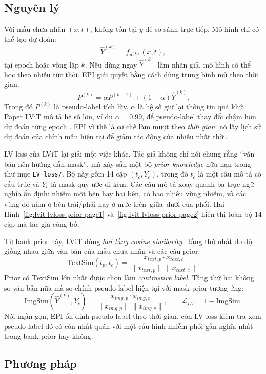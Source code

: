 \subsection*{Nguyên lý}

Với mẫu chưa nhãn \((x,t)\), không tồn tại \(y\) để so sánh trực tiếp. Mô hình chỉ có thể tạo dự đoán:
\[
\hat{Y}^{(k)} = f_{\theta^{(k)}}(x,t),
\]
tại epoch hoặc vòng lặp \(k\). Nếu dùng ngay \(\hat{Y}^{(k)}\) làm nhãn giả, mô hình có thể học theo nhiễu tức thời. EPI giải quyết bằng cách dùng trung bình mũ theo thời gian:
\[
P^{(k)}=\alpha P^{(k-1)} + (1-\alpha)\hat{Y}^{(k)}.
\]
Trong đó \(P^{(k)}\) là pseudo-label tích lũy, \(\alpha\) là hệ số giữ lại thông tin quá khứ. Paper LViT mô tả hệ số lớn, ví dụ \(\alpha=0.99\), để pseudo-label thay đổi chậm hơn dự đoán từng epoch \cite{li2023lvit}. EPI vì thế là cơ chế làm mượt theo \emph{thời gian}: nó lấy lịch sử dự đoán của chính mẫu hiện tại để giảm tác động của nhiễu nhất thời.

LV loss của LViT lại giải một việc khác. Tác giả không chỉ nói chung rằng ``văn bản nên hướng dẫn mask'', mà xây sẵn một bộ \emph{prior knowledge} hữu hạn trong thư mục \texttt{LV\_loss/}. Bộ này gồm 14 cặp \((t_c,Y_c)\), trong đó \(t_c\) là một câu mô tả có cấu trúc và \(Y_c\) là mask quy ước đi kèm. Các câu mô tả xoay quanh ba trục ngữ nghĩa ổn định: nhiễm một bên hay hai bên, có bao nhiêu vùng nhiễm, và các vùng đó nằm ở bên trái/phải hay ở mức trên--giữa--dưới của phổi. Hai Hình~\ref{fig:lvit-lvloss-prior-page1} và~\ref{fig:lvit-lvloss-prior-page2} hiển thị toàn bộ 14 cặp mà tác giả công bố.

Từ bank prior này, LViT dùng \emph{hai tầng cosine similarity}. Tầng thứ nhất đo độ giống nhau giữa văn bản của mẫu chưa nhãn và các câu prior:
\[
\mathrm{TextSim}(t_p,t_c)=
\frac{x_{text,p}\cdot x_{text,c}}
{\|x_{text,p}\|\,\|x_{text,c}\|}.
\]
Prior có \(\mathrm{TextSim}\) lớn nhất được chọn làm \emph{contrastive label}. Tầng thứ hai không so văn bản nữa mà so chính pseudo-label hiện tại với mask prior tương ứng:
\[
\mathrm{ImgSim}(\hat{Y}^{(k)},Y_c)=
\frac{x_{img,p}\cdot x_{img,c}}
{\|x_{img,p}\|\,\|x_{img,c}\|},
\qquad
\mathcal{L}_{LV}=1-\mathrm{ImgSim}.
\]
Nói ngắn gọn, EPI ổn định pseudo-label theo thời gian, còn LV loss kiểm tra xem pseudo-label đó có còn nhất quán với một cấu hình nhiễm phổi gần nghĩa nhất trong bank prior hay không.

\subsection*{Phương pháp}

